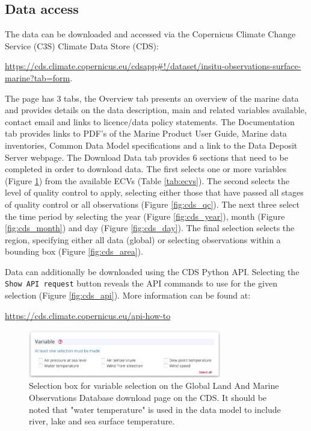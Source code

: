 \subsection{Data access}
The data can be downloaded and accessed via the Copernicus Climate Change Service (C3S) Climate Data Store (CDS):
\begin{center}
\sloppy\url{https://cds.climate.copernicus.eu/cdsapp#!/dataset/insitu-observations-surface-marine?tab=form}.
 \end{center}
The page has 3 tabs, the Overview tab presents an overview of the marine data and provides details on the data description, main and related variables available, contact email and links to licence/data policy statements. 
The Documentation tab provides links to PDF’s of the Marine Product User Guide, Marine data inventories, Common Data Model specifications and a link to the Data Deposit Server webpage. The Download Data tab provides 6 sections that need to be completed in order to download data. The first selects one or more variables (Figure \ref{fig:cds_variable}) from the available ECVs (Table \ref{tab:ecvs}). The second selects the level of quality control to apply, selecting either those that have passed all stages of quality control or all observations (Figure \ref{fig:cds_qc}). The next three select the time period  by selecting the year (Figure \ref{fig:cds_year}), month (Figure \ref{fig:cds_month}) and day (Figure \ref{fig:cds_day}). The final selection selects the region, specifying either all data (global) or selecting observations within a bounding box (Figure \ref{fig:cds_area}).

Data can additionally be downloaded using the CDS Python API. Selecting the \texttt{Show API request} button reveals the API commands to use for the given selection (Figure \ref{fig:cds_api}). More information can be found at:
\begin{center}
\url{https://cds.climate.copernicus.eu/api-how-to}
\end{center}

\FloatBarrier
\begin{figure}[h]
\centering
\includegraphics[width=0.75\textwidth]{resources/cds_variable_select.png}
\caption{Selection box for variable selection on the Global Land And Marine Observations Database download page on the CDS. It should be noted that "water temperature" is used in the data model to include river, lake and sea surface temperature.\\}
\label{fig:cds_variable}
\end{figure}


